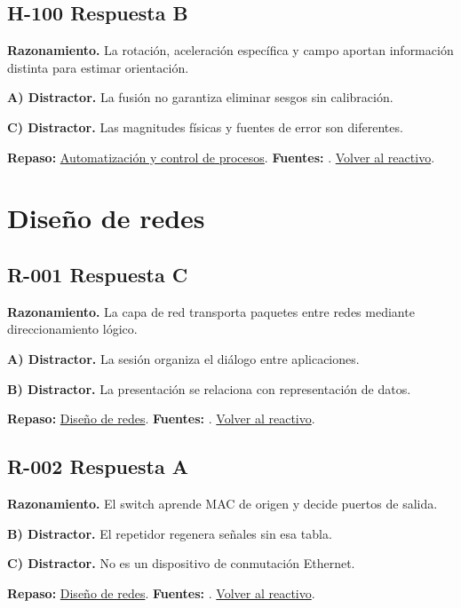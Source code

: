 \subsection*{H-100 \quad Respuesta B}\label{s:H-100}
\textbf{Razonamiento.} La rotación, aceleración específica y campo aportan información distinta para estimar orientación.

\textbf{A) Distractor. }La fusión no garantiza eliminar sesgos sin calibración.

\textbf{C) Distractor. }Las magnitudes físicas y fuentes de error son diferentes.

\textbf{Repaso:} \hyperref[sec:h4]{Automatización y control de procesos}. \textbf{Fuentes:} \cite{control,signals,pid}. \hyperref[q:H-100]{Volver al reactivo}.\par\medskip

\section{Diseño de redes}

\subsection*{R-001 \quad Respuesta C}\label{s:R-001}
\textbf{Razonamiento.} La capa de red transporta paquetes entre redes mediante direccionamiento lógico.

\textbf{A) Distractor. }La sesión organiza el diálogo entre aplicaciones.

\textbf{B) Distractor. }La presentación se relaciona con representación de datos.

\textbf{Repaso:} \hyperref[sec:r1]{Diseño de redes}. \textbf{Fuentes:} \cite{rfc8200,rfc4632,networks,vlan}. \hyperref[q:R-001]{Volver al reactivo}.\par\medskip

\subsection*{R-002 \quad Respuesta A}\label{s:R-002}
\textbf{Razonamiento.} El switch aprende MAC de origen y decide puertos de salida.

\textbf{B) Distractor. }El repetidor regenera señales sin esa tabla.

\textbf{C) Distractor. }No es un dispositivo de conmutación Ethernet.

\textbf{Repaso:} \hyperref[sec:r1]{Diseño de redes}. \textbf{Fuentes:} \cite{rfc8200,rfc4632,networks,vlan}. \hyperref[q:R-002]{Volver al reactivo}.\par\medskip

